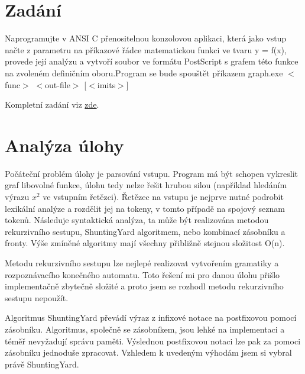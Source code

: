 \documentclass 	[a4paper,12pt]	{article}
\begin{document}
\section{Zadání}
\label{sec:zadani}
Naprogramujte v ANSI C přenositelnou konzolovou aplikaci, která jako vstup načte z parametru na příkazové řádce matematickou funkci ve tvaru y = f(x), provede její analýzu a vytvoří
soubor ve formátu PostScript s grafem této funkce na zvoleném definičním oboru.Program se bude spouštět příkazem graph.exe $<$func$>$ $<$out-file$>$ [$<$imits$>$] 

Kompletní zadání viz \href{http://www.kiv.zcu.cz/studies/predmety/pc/doc/work/sw2014-01.pdf}{zde}.

\section{Analýza úlohy}
\label{sec:ana_u}
Počáteční problém úlohy je parsování vstupu. Program má být schopen vykreslit graf libovolné funkce, úlohu tedy nelze řešit hrubou silou (například hledáním výrazu ${x}^{2}$ ve vstupním řetězci). Řetězec na vstupu je nejprve nutné podrobit lexikální analýze a rozdělit jej na tokeny, v tomto případě  na spojový seznam tokenů. Následuje syntaktická analýza, ta může být realizována metodou rekurzivního sestupu, ShuntingYard algoritmem, nebo kombinací zásobníku a fronty. Výše zmíněné algoritmy mají všechny přibližně stejnou složitost O(n).

Metodu rekurzivního sestupu lze nejlepé realizovat vytvořením gramatiky a rozpoznávacího konečného automatu. Toto řešení mi pro danou úlohu přišlo implementačně zbytečně složité a proto jsem se rozhodl metodu rekurzivního sestupu nepoužít.

Algoritmus ShuntingYard převádí výraz z infixové notace na postfixovou pomocí zásobníku. Algoritmus, společně se zásobníkem, jsou lehké na implementaci a téměř nevyžadují správu paměti. Výslednou postfixovou notaci lze pak za pomoci zásobníku jednoduše zpracovat. Vzhledem k uvedeným výhodám jsem si vybral právě ShuntingYard. 
\end{document}
